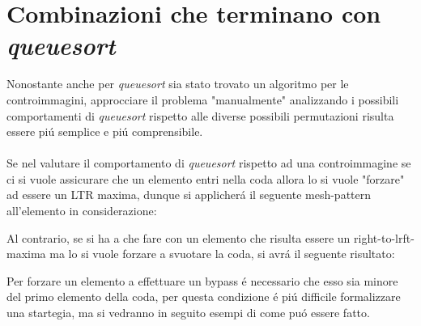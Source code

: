 \section*{Combinazioni che terminano con \textit{queuesort}}
Nonostante anche per \textit{queuesort} sia stato trovato un algoritmo per le controimmagini\cite{magnusson2013sorting}, approcciare il problema "manualmente" analizzando i possibili comportamenti di \textit{queuesort} rispetto alle diverse possibili permutazioni risulta essere pi\'u semplice e pi\'u comprensibile.\\\\
Se nel valutare il comportamento di \textit{queuesort} rispetto ad una controimmagine se ci si vuole assicurare che un elemento entri nella coda allora lo si vuole "forzare" ad essere un LTR maxima, dunque si applicher\'a il seguente mesh-pattern all'elemento in considerazione:
\begin{center}
\end{center}
Al contrario, se si ha a che fare con un elemento che risulta essere un right-to-lrft-maxima ma lo si vuole forzare a svuotare la coda, si avr\'a il seguente risultato:
\begin{center}
\end{center}
Per forzare un elemento a effettuare un bypass \'e necessario che esso sia minore del primo elemento della coda, per questa condizione \'e pi\'u difficile formalizzare una startegia, ma si vedranno in seguito esempi di come pu\'o essere fatto. 
